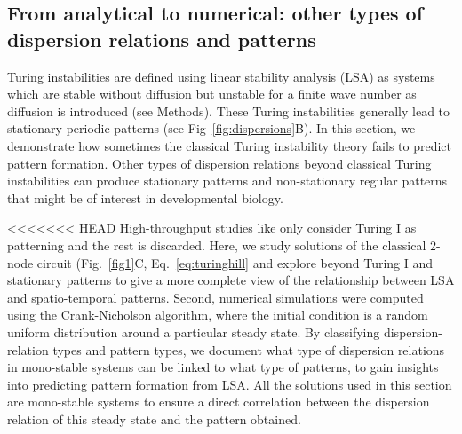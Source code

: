 \subsection*{From analytical to numerical: other types of dispersion relations and patterns} \label{nogrowth}

Turing instabilities are defined using linear stability analysis (LSA) as systems which are stable without diffusion but unstable for a finite wave number as diffusion is introduced (see Methods). These Turing instabilities generally lead to stationary periodic patterns (see Fig~\ref{fig:dispersions}B). In this section, we demonstrate how sometimes the classical Turing instability theory fails to predict pattern formation.
Other types of dispersion relations beyond classical Turing instabilities can produce stationary patterns and non-stationary regular patterns that might be of interest in developmental biology.

<<<<<<< HEAD
High-throughput studies like \cite{Scholes2019, Zheng2016, Marcon} only consider Turing I as patterning and the rest is discarded.
Here, we study solutions of the classical 2-node circuit (Fig.~\ref{fig1}C, Eq.~\ref{eq:turinghill} and explore beyond Turing I and stationary patterns to give a more complete view of the relationship between LSA and spatio-temporal patterns.
Second, numerical simulations were computed using the Crank-Nicholson algorithm, where the initial condition is a random uniform distribution around a particular steady state.
By classifying dispersion-relation types and pattern types, we document what type of dispersion relations in mono-stable systems can be linked to what type of patterns, to gain insights into predicting pattern formation from LSA. All the solutions used in this section are mono-stable systems to ensure a direct correlation between the dispersion relation of this steady state and the pattern obtained.


